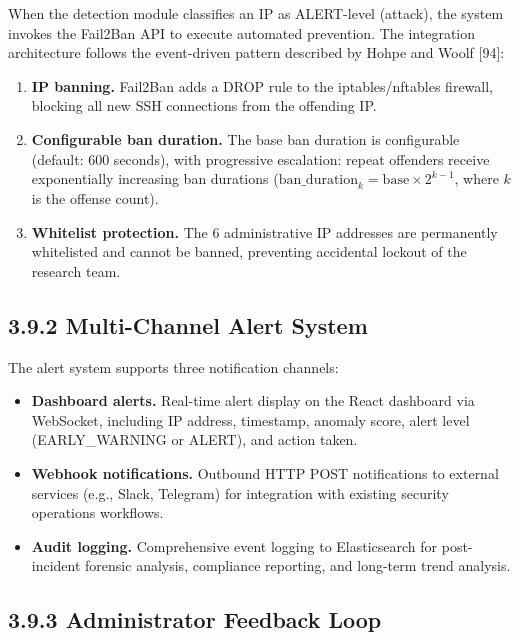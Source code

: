 \documentclass[
  a4paper]{report}
\providecommand{\tightlist}{%
  \setlength{\itemsep}{0pt}\setlength{\parskip}{0pt}}
\begin{document}
When the detection module classifies an IP as ALERT-level (attack), the
system invokes the Fail2Ban API to execute automated prevention. The
integration architecture follows the event-driven pattern described by
Hohpe and Woolf {[}94{]}:

\begin{enumerate}
\def\labelenumi{\arabic{enumi}.}
\tightlist
\item
  \textbf{IP banning.} Fail2Ban adds a DROP rule to the
  iptables/nftables firewall, blocking all new SSH connections from the
  offending IP.
\item
  \textbf{Configurable ban duration.} The base ban duration is
  configurable (default: 600 seconds), with progressive escalation:
  repeat offenders receive exponentially increasing ban durations
  (\(\text{ban\_duration}_k = \text{base} \times 2^{k-1}\), where \(k\)
  is the offense count).
\item
  \textbf{Whitelist protection.} The 6 administrative IP addresses are
  permanently whitelisted and cannot be banned, preventing accidental
  lockout of the research team.
\end{enumerate}

\subsection{3.9.2 Multi-Channel Alert
System}\label{multi-channel-alert-system}

The alert system supports three notification channels:

\begin{itemize}
\tightlist
\item
  \textbf{Dashboard alerts.} Real-time alert display on the React
  dashboard via WebSocket, including IP address, timestamp, anomaly
  score, alert level (EARLY\_WARNING or ALERT), and action taken.
\item
  \textbf{Webhook notifications.} Outbound HTTP POST notifications to
  external services (e.g., Slack, Telegram) for integration with
  existing security operations workflows.
\item
  \textbf{Audit logging.} Comprehensive event logging to Elasticsearch
  for post-incident forensic analysis, compliance reporting, and
  long-term trend analysis.
\end{itemize}

\subsection{3.9.3 Administrator Feedback
Loop}\label{administrator-feedback-loop}
\end{document}
